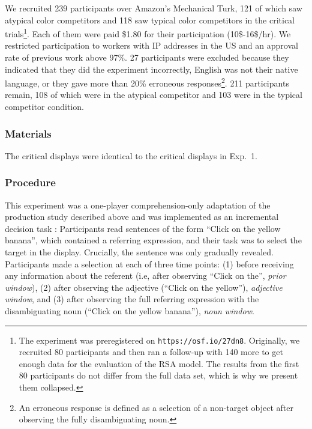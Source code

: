\documentclass[a4paper,man,floatsintext,natbib]{apa6}
\begin{document}
We recruited 239 participants over Amazon's Mechanical Turk, 121 of which saw atypical color competitors and 118 saw typical color competitors in the critical trials\footnote{The experiment was preregistered on \texttt{https://osf.io/27dn8}. Originally, we recruited 80 participants and then ran a follow-up with 140 more to get enough data for the evaluation of the RSA model. The results from the first 80 participants do not differ from the full data set, which is why we present them collapsed.}. Each of them were paid \$1.80 for their participation (10\$-16\$/hr). We restricted participation to workers with IP addresses in the US and an approval rate of previous work above 97\%. 
27 participants were excluded because they indicated that they did the experiment incorrectly, English was not their native language, or they gave more than 20\% erroneous responses\footnote{An erroneous response is defined as a selection of a non-target object after observing the fully disambiguating noun.}. 211 participants remain, 108 of which were in the atypical competitor and 103 were in the typical competitor condition. 




\subsubsection{Materials}

The critical displays were identical to the critical displays in Exp.~1. 

\subsubsection{Procedure}

This experiment was a one-player comprehension-only adaptation of the production study described above and was implemented as an incremental decision task \cite{Qing:2018}: Participants read sentences of the form ``Click on the yellow banana'', which contained a referring expression, and their task was to select the target in the display. Crucially, the sentence was only gradually revealed. Participants made a selection at each of three time points: (1) before receiving any information about the referent (i.e, after observing ``Click on the'', \emph{prior window}), (2) after observing the adjective (``Click on the yellow''), \emph{adjective window}, and (3) after observing the full referring expression with the disambiguating noun (``Click on the yellow banana''), \emph{noun window}. 
\end{document}
